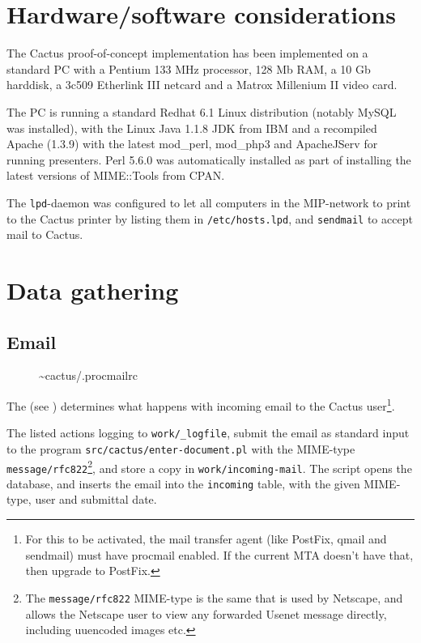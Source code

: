 \section{Hardware/software considerations}

The Cactus proof-of-concept implementation has been implemented on a
standard PC with a Pentium 133 MHz processor, 128 Mb RAM, a 10 Gb
harddisk, a 3c509 Etherlink III netcard and a Matrox Millenium II
video card.

The PC is running a standard Redhat 6.1 Linux distribution (notably
MySQL was installed), with the Linux Java 1.1.8 JDK from IBM and a
recompiled Apache (1.3.9) with the latest mod\_perl, mod\_php3 and
ApacheJServ for running presenters.  Perl 5.6.0 was automatically
installed as part of installing the latest versions of MIME::Tools
from CPAN.

The \texttt{lpd}-daemon was configured to let all computers in the
MIP-network to print to the Cactus printer by listing them in
\texttt{/etc/hosts.lpd}, and \texttt{sendmail} to accept mail to
Cactus.



\section{Data gathering}


\subsection{Email}

\begin{figure}[htbp]
  \begin{center}
    \caption{\~{}cactus/.procmailrc}
    \label{fig:cactus-procmailrc}
  \end{center}
\end{figure}

The  (see
) determines what happens with incoming
email to the Cactus user\footnote{For this to be activated, the mail
  transfer agent (like PostFix, qmail and sendmail) must have procmail
  enabled.  If the current MTA doesn't have that, then upgrade to
  PostFix.}.

The listed actions logging to \texttt{work/_logfile}, submit the email
as standard input to the program \texttt{src/cactus/enter-document.pl}
with the MIME-type \texttt{message/rfc822}\footnote{The
\texttt{message/rfc822} MIME-type is the same that is used by
Netscape, and allows the Netscape user to view any forwarded Usenet
message directly, including uuencoded images etc.}, and store a copy
in \texttt{work/incoming-mail}.  The script opens the database, and
inserts the email into the \texttt{incoming} table, with the given
MIME-type, user and submittal date.

